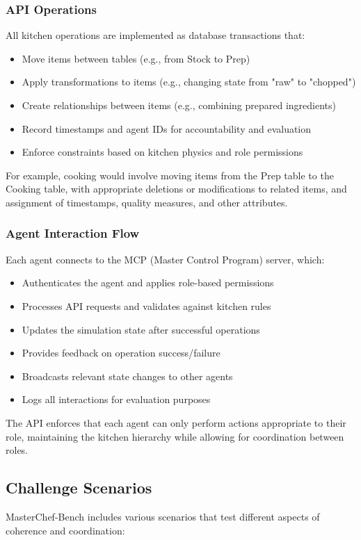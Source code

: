 \documentclass{article}
\begin{document}
\subsubsection{API Operations}
All kitchen operations are implemented as database transactions that:

\begin{itemize}
    \item Move items between tables (e.g., from Stock to Prep)
    \item Apply transformations to items (e.g., changing state from "raw" to "chopped")
    \item Create relationships between items (e.g., combining prepared ingredients)
    \item Record timestamps and agent IDs for accountability and evaluation
    \item Enforce constraints based on kitchen physics and role permissions
\end{itemize}

For example, cooking would involve moving items from the Prep table to the Cooking table, with appropriate deletions or modifications to related items, and assignment of timestamps, quality measures, and other attributes.

\subsubsection{Agent Interaction Flow}
Each agent connects to the MCP (Master Control Program) server, which:

\begin{itemize}
    \item Authenticates the agent and applies role-based permissions
    \item Processes API requests and validates against kitchen rules
    \item Updates the simulation state after successful operations
    \item Provides feedback on operation success/failure
    \item Broadcasts relevant state changes to other agents
    \item Logs all interactions for evaluation purposes
\end{itemize}

The API enforces that each agent can only perform actions appropriate to their role, maintaining the kitchen hierarchy while allowing for coordination between roles.

\subsection{Challenge Scenarios}
MasterChef-Bench includes various scenarios that test different aspects of coherence and coordination:
\end{document}
